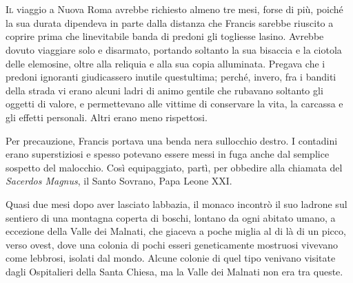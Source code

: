 	\chapter{\phantom{title}}


\lettrine{I}{l} viaggio a Nuova Roma avrebbe richiesto almeno tre mesi, forse di più,
poiché la sua durata dipendeva in parte dalla distanza che Francis
sarebbe riuscito a coprire prima che l\textquotesingle inevitabile banda
di predoni gli togliesse l\textquotesingle asino. Avrebbe dovuto
viaggiare solo e disarmato, portando soltanto la sua bisaccia e la
ciotola delle elemosine, oltre alla reliquia e alla sua copia
alluminata. Pregava che i predoni ignoranti giudicassero inutile
quest\textquotesingle ultima; perché, invero, fra i banditi della strada
vi erano alcuni ladri di animo gentile che rubavano soltanto gli oggetti
di valore, e permettevano alle vittime di conservare la vita, la
carcassa e gli effetti personali. Altri erano meno rispettosi.

Per precauzione, Francis portava una benda nera
sull\textquotesingle occhio destro. I contadini erano superstiziosi e
spesso potevano essere messi in fuga anche dal semplice sospetto del
malocchio. Così equipaggiato, partì, per obbedire alla chiamata del
\emph{Sacerdos Magnus}, il Santo Sovrano, Papa Leone XXI.

Quasi due mesi dopo aver lasciato l\textquotesingle abbazia, il monaco
incontrò il suo ladrone sul sentiero di una montagna coperta di boschi,
lontano da ogni abitato umano, a eccezione della Valle dei Malnati, che
giaceva a poche miglia al di là di un picco, verso ovest, dove una
colonia di pochi esseri geneticamente mostruosi vivevano come lebbrosi,
isolati dal mondo. Alcune colonie di quel tipo venivano visitate dagli
Ospitalieri della Santa Chiesa, ma la Valle dei Malnati non era tra
queste.

